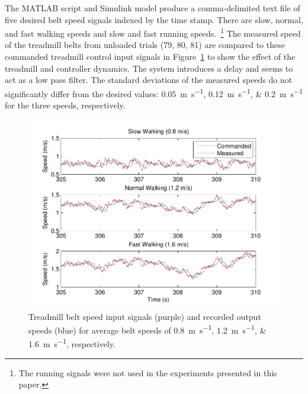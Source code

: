 \documentclass[fleqn,12pt]{wlpeerj}
\begin{document}
The MATLAB script and Simulink model produce a comma-delimited text file of
five desired belt speed signals indexed by the time stamp. There are slow, normal,
and fast walking speeds and slow and fast running speeds.~\footnote{The running
signals were not used in the experiments presented in this paper.} The measured
speed of the treadmill belts from unloaded trials (79, 80, 81) are compared to
these commanded treadmill control input signals in
Figure~\ref{fig:input_output} to show the effect of the treadmill and
controller dynamics. The system introduces a delay and seems to act as a low
pass filter. The standard deviations of the measured speeds do not
significantly differ from the desired values:
\SIlist{0.05;0.12;0.2}{\meter\per\second} for the three speeds, respectively.
%
\begin{figure}
  \centering
  \includegraphics{figures/input_vs_output.pdf}
  \caption{Treadmill belt speed input signals (purple) and recorded output
    speeds (blue) for average belt speeds of
    \SIlist{0.8;1.2;1.6}{\meter\per\second}, respectively.}
  \label{fig:input_output}
\end{figure}
\end{document}

